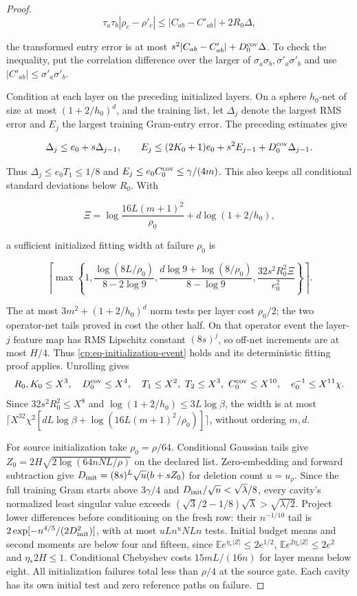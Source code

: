 \begin{proof}
\[
\tau_a\tau_b|\rho_c-\rho'_c|
 \le|C_{ab}-C'_{ab}|+2R_0\Delta,
\]

the transformed entry error is at most
$s^2|C_{ab}-C'_{ab}|+D_0^{\rm cov}\Delta$.
To check the inequality, put the correlation difference over the larger
of $\sigma_a\sigma_b,\sigma'_a\sigma'_b$ and use
$|C'_{ab}|\le\sigma'_a\sigma'_b$.

Condition at each layer on the preceding initialized layers. On a sphere
$h_0$-net of size at most $(1+2/h_0)^d$, and the training list, let
$\Delta_j$ denote the largest RMS error and $E_j$ the largest training
Gram-entry error. The preceding estimates give

\[
\Delta_j\le e_0+s\Delta_{j-1},\qquad
E_j\le(2K_0+1)e_0+s^2E_{j-1}+D_0^{\rm cov}\Delta_{j-1}.
\]

Thus $\Delta_j\le e_0T_1\le1/8$ and
$E_j\le e_0C_0^{\rm cov}\le\gamma/(4m)$. This also keeps all
conditional standard deviations below $R_0$.
With

\[
\Xi=\log\frac{16L(m+1)^2}{\rho_0}
                 +d\log(1+2/h_0),
\]

a sufficient initialized fitting width at failure $\rho_0$ is

\begin{equation}
\left\lceil\max\left\{1,
 \frac{\log(8L/\rho_0)}{8-2\log9},
 \frac{d\log9+\log(8/\rho_0)}{8-\log9},
 \frac{32s^2R_0^2\Xi}{e_0^2}\right\}\right\rceil.
\label{cp:poly:eq:initialization}
\end{equation}

The at most $3m^2+(1+2/h_0)^d$ norm tests per layer cost
$\rho_0/2$; the two operator-net tails proved in 
cost the other half. On that operator event the layer-$j$ feature map
has RMS Lipschitz constant $(8s)^j$, so off-net increments are at
most $H/4$. Thus \eqref{cp:eq-initialization-event} holds and its
deterministic fitting proof applies. Unrolling gives
\[
R_0,K_0\le X^3,\quad D_0^{\rm cov}\le X^4,\quad
T_1\le X^2,\ T_2\le X^3,\ C_0^{\rm cov}\le X^{10},\quad
e_0^{-1}\le X^{11}\chi.
\]
Since $32s^2R_0^2\le X^8$ and
$\log(1+2/h_0)\le3L\log\beta$, the width is at most
$\lceil X^{32}\chi^2[dL\log\beta+\log(16L(m+1)^2/\rho_0)]\rceil$,
without ordering $m,d$.

For source initialization take $\rho_0=\rho/64$.
Conditional Gaussian tails give
$Z_0=2H\sqrt{2\log(64nNL/\rho)}$ on the declared list.
Zero-embedding and forward subtraction give
$D_{\rm init}=(8s)^L\sqrt u(b+sZ_0)$ for deletion count
$u=u_\rho$. Since the full training Gram starts above $3\gamma/4$
and $D_{\rm init}/\sqrt n<\sqrt\lambda/8$, every cavity's normalized
least singular value exceeds
$(\sqrt3/2-1/8)\sqrt\lambda>\sqrt{\lambda/2}$.
Project lower differences before conditioning on the fresh row:
their $n^{-1/10}$ tail is
$2\exp[-n^{4/5}/(2D_{\rm init}^2)]$, with at most $uLn^uNLn$ tests.
Initial budget means and second moments are below four and fifteen,
since $\mathbb E e^{\eta_*|Z|}\le2e^{1/2}$,
$\mathbb E e^{2\eta_*|Z|}\le2e^2$ and $\eta_*2H\le1$.
Conditional Chebyshev costs $15mL/(16n)$ for layer means below eight.
All initialization failures total less than $\rho/4$ at the source gate.
Each cavity has its own initial test and zero reference paths on failure.


\end{proof}
